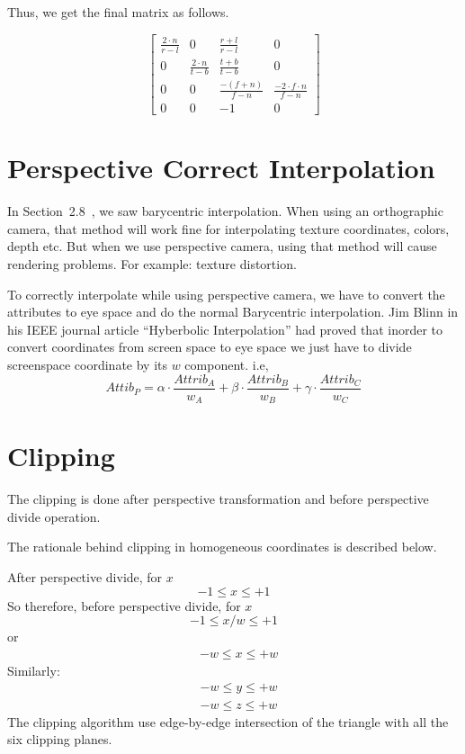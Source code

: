 Thus, we get the final matrix as follows.

\begin{equation}
\begin{bmatrix}
\frac{2 \cdot n}{r-l} & 0 & \frac{r+l}{r-l} & 0 \\
0 & \frac{2 \cdot n}{t-b} & \frac{t+b}{t-b} & 0 \\
0 & 0 & \frac{-(f+n)}{f-n} & \frac{-2\cdot f \cdot n}{f-n} \\
0 & 0 & -1 & 0
\end{bmatrix}
\end{equation}

\section{Perspective Correct Interpolation}
In Section~2.8~, we saw barycentric interpolation. When using an orthographic camera, that method will work fine for interpolating texture coordinates, colors, depth etc. But when we use perspective camera, using that method will cause rendering problems. For example: texture distortion.

To correctly interpolate while using perspective camera, we have to convert the attributes to eye space and do the normal Barycentric interpolation.
Jim Blinn in his IEEE journal article ``Hyberbolic Interpolation'' had proved that inorder to convert coordinates from screen space to eye space we just have to divide screenspace coordinate by its $w$ component. 
i.e,
\begin{equation}
Attib_P = \alpha \cdot \frac{Attrib_A}{w_A} + \beta \cdot \frac{Attrib_B}{w_B} + \gamma \cdot \frac{Attrib_C}{w_C}
\end{equation}

\section{Clipping}
The clipping is done after perspective transformation and before perspective divide operation. 

The rationale behind clipping in homogeneous coordinates is described below.

After perspective divide, for $x$
\[
-1 \leq x \leq +1
\]
So therefore, before perspective divide, for $x$
\[
-1 \leq x/w \leq +1
\]
or
\begin{align}
&-w \leq x \leq +w
\end{align}
Similarly:
\begin{align}
&-w \leq y \leq +w \\
&-w \leq z \leq +w
\end{align}
The clipping algorithm use edge-by-edge intersection of the triangle with all the six clipping planes. 

